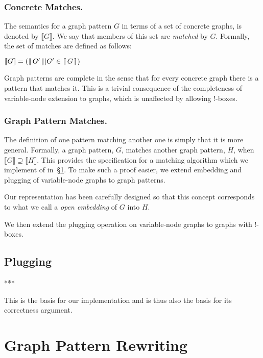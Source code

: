 \documentclass[runningheads]{llncs}
\newcommand{\vinterp}[1]{\lfloor\hspace{-0.27em}|\, #1\, |\hspace{-0.27em}\rfloor}
\newcommand{\binterp}[1]{\lceil\hspace{-0.27em}|\, #1\, |\hspace{-0.27em}\rceil}
\newcommand{\minterp}[1]{\llbracket #1 \rrbracket}
\begin{document}
\subsubsection{Concrete Matches.}

The semantics for a graph pattern $G$ in terms of a set of concrete
graphs, is denoted by $\minterp{G}$. We say that members of this set
are \emph{matched} by $G$. Formally, the set of matches are defined as
follows:

$\minterp{G} = (\vinterp{G'} | G' \in \binterp{G})$

Graph patterns are complete in the sense that for every concrete graph
there is a pattern that matches it. This is a trivial consequence of
the completeness of variable-node extension to graphs, which is
unaffected by allowing !-boxes.

\subsubsection{Graph Pattern Matches.}

The definition of one pattern matching another one is simply that it
is more general. Formally, a graph pattern, $G$, matches another graph
pattern, $H$, when $\minterp{G} \supseteq \minterp{H}$. This provides
the specification for a matching algorithm which we implement of
in~\S\ref{sec:rewriting}. To make such a proof easier, we extend
embedding and plugging of variable-node graphs to graph patterns. 

Our representation has been carefully designed so that this concept
corresponds to what we call a \emph{open embedding} of $G$ into
$H$. 


We then extend the plugging
operation on variable-node graphs to graphs with !-boxes.


\subsection{Plugging}



*** 

This is the basis for our implementation and is thus also the basis
for its correctness argument. 




\section{Graph Pattern Rewriting}
\label{sec:rewriting}
\end{document}
